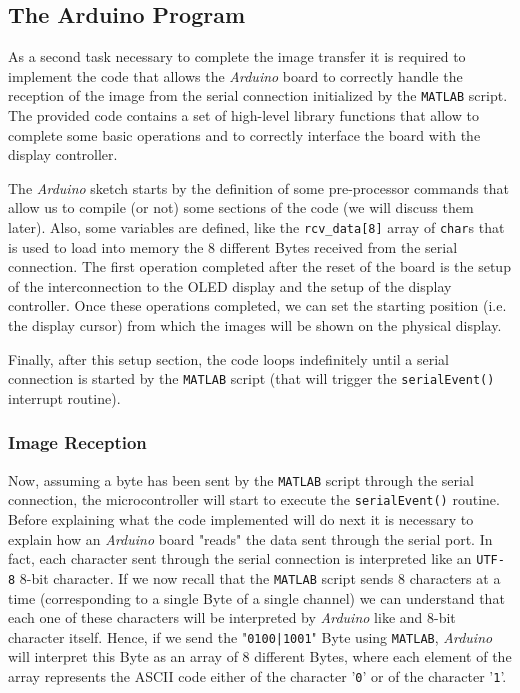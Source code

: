 \documentclass[a4paper]{article}
\begin{document}
    \subsection{The Arduino Program}
        As a second task necessary to complete the image transfer it is required to implement the code that allows the \emph{Arduino} board to correctly handle the reception of the image from the serial connection initialized by the \texttt{MATLAB} script.
        The provided code contains a set of high-level library functions that allow to complete some basic operations and to correctly interface the board with the display controller.

        The \emph{Arduino} sketch starts by the definition of some pre-processor commands that allow us to compile (or not) some sections of the code (we will discuss them later).
        Also, some variables are defined, like the \texttt{rcv\_data[8]} array of \texttt{char}s that is used to load into memory the 8 different Bytes received from the serial connection.
        The first operation completed after the reset of the board is the setup of the interconnection to the OLED display and the setup of the display controller. Once these operations completed, we can set the starting position (i.e. the display cursor) from which the images will be shown on the physical display.

        Finally, after this setup section, the code loops indefinitely until a serial connection is started by the \texttt{MATLAB} script (that will trigger the \texttt{serialEvent()} interrupt routine).

        \subsubsection{Image Reception}
            Now, assuming a byte has been sent by the \texttt{MATLAB} script through the serial connection, the microcontroller will start to execute the \texttt{serialEvent()} routine.
            Before explaining what the code implemented will do next it is necessary to explain how an \emph{Arduino} board "reads" the data sent through the serial port. In fact, each character sent through the serial connection is interpreted like an \texttt{UTF-8} 8-bit character. If we now recall that the \texttt{MATLAB} script sends 8 characters at a time (corresponding to a single Byte of a single channel) we can understand that each one of these characters will be interpreted by \emph{Arduino} like and 8-bit character itself. Hence, if we send the "\texttt{0100|1001}" Byte using \texttt{MATLAB}, \emph{Arduino} will interpret this Byte as an array of 8 different Bytes, where each element of the array represents the ASCII code either of the character '\texttt{0}' or of the character '\texttt{1}'.
\end{document}
